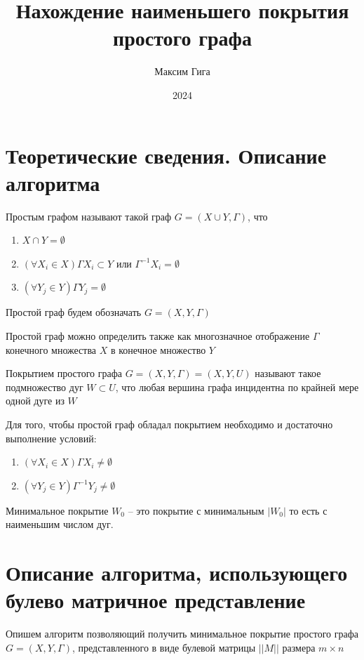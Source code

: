 \documentclass[12pt]{article}
\title{Нахождение наименьшего покрытия простого графа}
\author{Максим Гига}
\date{2024}
\begin{document}
\maketitle

\section{Теоретические сведения. Описание алгоритма}

Простым графом называют такой граф $G = (X \cup Y, \Gamma)$, что
\begin{enumerate}
    \item $X \cap Y = \emptyset$
    \item $(\forall X_i \in X) \Gamma X_i \subset Y$
          или $\Gamma^{-1} X_i = \emptyset$
    \item $(\forall Y_j \in Y) \Gamma Y_j = \emptyset$
\end{enumerate}

Простой граф будем обозначать $G = (X, Y, \Gamma)$

Простой граф можно определить также как многозначное
отображение $\Gamma$ конечного множества $X$ в конечное
множество $Y$

Покрытием простого графа $G = (X, Y, \Gamma) = (X, Y, U)$ называют
такое подмножество дуг $W \subset U$, что любая вершина графа
инцидентна по крайней мере одной дуге из $W$

Для того, чтобы простой граф обладал покрытием необходимо и достаточно
выполнение условий:
\begin{enumerate}
    \item $(\forall X_i \in X) \Gamma X_i \ne \emptyset$
    \item $(\forall Y_j \in Y) \Gamma^{-1} Y_j \ne \emptyset$
\end{enumerate}

Минимальное покрытие $W_0$ – это покрытие с минимальным $|W_0|$
то есть с наименьшим числом дуг.

\section{Описание алгоритма, использующего булево
  матричное представление}

Опишем алгоритм позволяющий получить минимальное покрытие
простого графа \\ $G = (X, Y, \Gamma)$, представленного
в виде булевой матрицы $||M||$ размера $m \times n$
\end{document}
